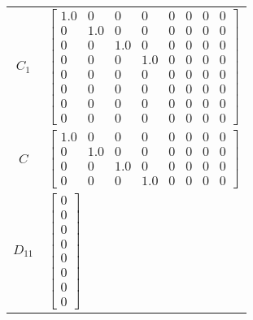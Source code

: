 \begin{tabular}{cl}
 $C_{1}$  & $\left[\begin{matrix}1.0 & 0 & 0 & 0 & 0 & 0 & 0 & 0\\0 & 1.0 & 0 & 0 & 0 & 0 & 0 & 0\\0 & 0 & 1.0 & 0 & 0 & 0 & 0 & 0\\0 & 0 & 0 & 1.0 & 0 & 0 & 0 & 0\\0 & 0 & 0 & 0 & 0 & 0 & 0 & 0\\0 & 0 & 0 & 0 & 0 & 0 & 0 & 0\\0 & 0 & 0 & 0 & 0 & 0 & 0 & 0\\0 & 0 & 0 & 0 & 0 & 0 & 0 & 0\end{matrix}\right]$                                                                                                                                                                              \\
   $C$    & $\left[\begin{matrix}1.0 & 0 & 0 & 0 & 0 & 0 & 0 & 0\\0 & 1.0 & 0 & 0 & 0 & 0 & 0 & 0\\0 & 0 & 1.0 & 0 & 0 & 0 & 0 & 0\\0 & 0 & 0 & 1.0 & 0 & 0 & 0 & 0\end{matrix}\right]$                                                                                                                                                                                                                                                                                                          \\
 $D_{11}$ & $\left[\begin{matrix}0\\0\\0\\0\\0\\0\\0\\0\end{matrix}\right]$                                                                                                                                                                                                                                                                                                                                                                                                                      \\

\end{tabular}
